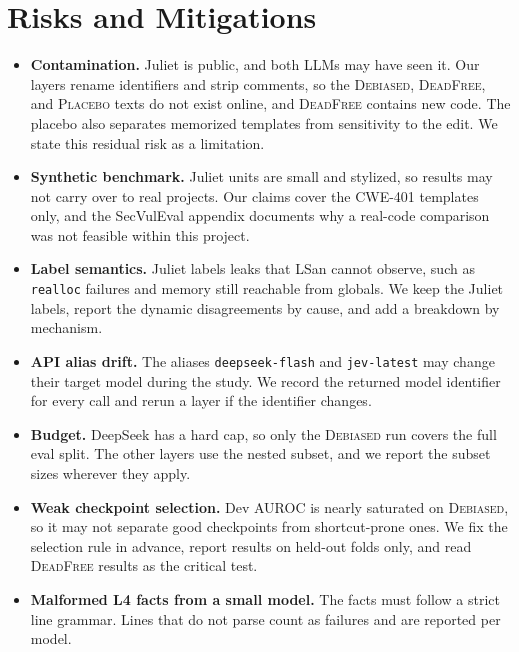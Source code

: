 \documentclass[conference]{IEEEtran}
\newcommand{\Deb}{\textsc{Debiased}}
\newcommand{\Dead}{\textsc{DeadFree}}
\newcommand{\Plac}{\textsc{Placebo}}
\newcommand{\code}[1]{\texttt{#1}}
\newcommand{\cwe}{CWE-401}
\begin{document}
\section{Risks and Mitigations}
\label{sec:risks}
\begin{itemize}
\item \textbf{Contamination.} Juliet is public, and both LLMs may have seen it. Our layers rename identifiers and strip comments, so the \Deb{}, \Dead{}, and \Plac{} texts do not exist online, and \Dead{} contains new code. The placebo also separates memorized templates from sensitivity to the edit. We state this residual risk as a limitation.
\item \textbf{Synthetic benchmark.} Juliet units are small and stylized, so results may not carry over to real projects. Our claims cover the \cwe{} templates only, and the SecVulEval appendix documents why a real-code comparison was not feasible within this project.
\item \textbf{Label semantics.} Juliet labels leaks that LSan cannot observe, such as \code{realloc} failures and memory still reachable from globals. We keep the Juliet labels, report the dynamic disagreements by cause, and add a breakdown by mechanism.
\item \textbf{API alias drift.} The aliases \code{deepseek-flash} and \code{jev-latest} may change their target model during the study. We record the returned model identifier for every call and rerun a layer if the identifier changes.
\item \textbf{Budget.} DeepSeek has a hard cap, so only the \Deb{} run covers the full eval split. The other layers use the nested subset, and we report the subset sizes wherever they apply.
\item \textbf{Weak checkpoint selection.} Dev AUROC is nearly saturated on \Deb{}, so it may not separate good checkpoints from shortcut-prone ones. We fix the selection rule in advance, report results on held-out folds only, and read \Dead{} results as the critical test.
\item \textbf{Malformed L4 facts from a small model.} The facts must follow a strict line grammar. Lines that do not parse count as failures and are reported per model.
\end{itemize}



\end{document}

